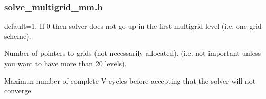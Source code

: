 \documentclass[letterpaper,10pt,english]{sphinxmanual}
\begin{document}
\subsubsection{solve\_multigrid\_mm.h}
\label{\detokenize{sphinx-c-apidoc/output/gravity/mond_mass/solve_multigrid_mm_h:solve-multigrid-mm-h}}\label{\detokenize{sphinx-c-apidoc/output/gravity/mond_mass/solve_multigrid_mm_h::doc}}

\begin{fulllineitems}
\label{\detokenize{sphinx-c-apidoc/output/gravity/mond_mass/solve_multigrid_mm_h:c.GO_UP_FIRST}}%
\pysigstartmultiline
{}%
\pysigstopmultiline
default=1.   If 0 then solver does not go up in the first multigrid level (i.e. one grid scheme).

\end{fulllineitems}


\begin{fulllineitems}
\label{\detokenize{sphinx-c-apidoc/output/gravity/mond_mass/solve_multigrid_mm_h:c.GO_UP_SECOND}}%
\pysigstartmultiline
{}%
\pysigstopmultiline
\end{fulllineitems}


\begin{fulllineitems}
\label{\detokenize{sphinx-c-apidoc/output/gravity/mond_mass/solve_multigrid_mm_h:c.MAX_GRIDS}}%
\pysigstartmultiline
{}%
\pysigstopmultiline
Number of pointers to grids (not necessarily allocated). (i.e. not important unless you want to have more than 20 levels).

\end{fulllineitems}


\begin{fulllineitems}
\label{\detokenize{sphinx-c-apidoc/output/gravity/mond_mass/solve_multigrid_mm_h:c.MAX_ITERATION}}%
\pysigstartmultiline
{}%
\pysigstopmultiline
Maximun number of complete V cycles before accepting that the solver will not converge.

\end{fulllineitems}
\end{document}
